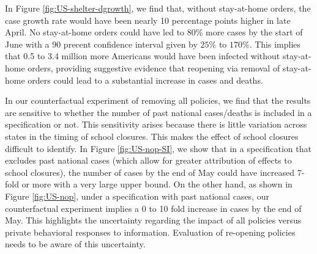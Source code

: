 \documentclass[11pt,reqno,letter]{amsart}
\theoremstyle{definition}
\begin{document}
In Figure \ref{fig:US-shelter-dgrowth}, we find that, without stay-at-home orders, the case
growth rate would have been nearly 10 percentage points higher in late April. No stay-at-home orders could have led to 80\% more cases by the start of June with a 90 precent confidence interval given by  $25\%$ to $170\%$. This implies that 0.5 to 3.4 million more Americans would have been infected without stay-at-home orders, providing suggestive evidence that reopening via removal of stay-at-home orders could lead to a substantial increase in cases and deaths.

In our counterfactual experiment of removing all policies, we find that the results are sensitive to whether  the number of past national cases/deaths is included  in a specification or not. This sensitivity arises because there is little variation across states in the timing of school closures.  This makes the effect of school closures difficult to identify. In Figure \ref{fig:US-nop-SI}, we show that in a specification that excludes past national cases (which allow for greater attribution of effects to school closures), the number of cases by the end of May could have increased 7-fold or more with a very large upper bound. On the other hand, as shown in Figure \ref{fig:US-nop}, under a specification with past national cases, our counterfactual experiment implies a 0 to 10 fold increase in cases by the end of May.  This highlights the uncertainty regarding the impact of all policies versus private behavioral responses to information. Evaluation of re-opening policies needs to be aware of this uncertainty.



%
\end{document}
